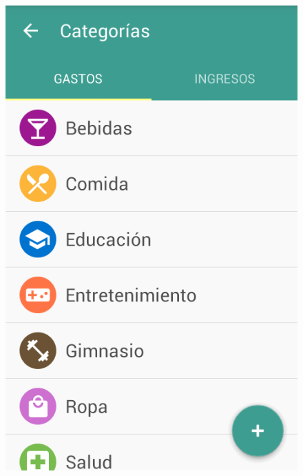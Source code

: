 \begin{figure}[ht]
\centering
\begin{minipage}{.5\textwidth}
  \centering
  \includegraphics[scale=0.45,type=png,ext=.png,read=.png]{imagenes/expense_categories}
  \captionsetup{justification=centering}
  \label{fig:interfazListarExpenseCategories}
\end{minipage}%
\begin{minipage}{.5\textwidth}
\centering

\end{minipage}
\end{figure}
